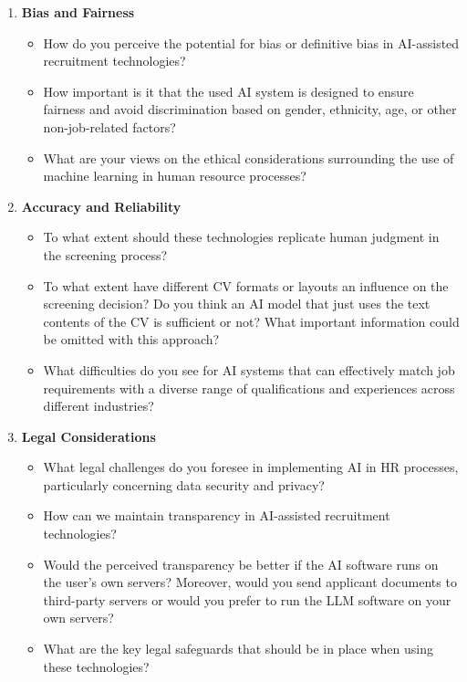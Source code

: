 \documentclass[draft,final]{thesisclass} %
\begin{document}
\begin{enumerate}
    \item \textbf{Bias and Fairness}
    \begin{itemize}
        \item How do you perceive the potential for bias or definitive bias in \acs{AI}-assisted recruitment technologies?
        \item How important is it that the used \acs{AI} system is designed to ensure fairness and avoid discrimination based on gender, ethnicity, age, or other non-job-related factors?
        \item What are your views on the ethical considerations surrounding the use of machine learning in human resource processes?
    \end{itemize}
    \item \textbf{Accuracy and Reliability}
    \begin{itemize}
        \item To what extent should these technologies replicate human judgment in the screening process?
        \item To what extent have different \acs{CV} formats or layouts an influence on the screening decision? Do you think an \acs{AI} model that just uses the text contents of the \acs{CV} is sufficient or not? What important information could be omitted with this approach?
        \item What difficulties do you see for \acs{AI} systems that can effectively match job requirements with a diverse range of qualifications and experiences across different industries?
    \end{itemize}
    \item \textbf{Legal Considerations}
    \begin{itemize}
        \item What legal challenges do you foresee in implementing \acs{AI} in \acs{HR} processes, particularly concerning data security and privacy?
        \item How can we maintain transparency in \acs{AI}-assisted recruitment technologies? 
        \item Would the perceived transparency be better if the \acs{AI} software runs on the user's own servers? Moreover, would you send applicant documents to third-party servers or would you prefer to run the \acs{LLM} software on your own servers?
        \item What are the key legal safeguards that should be in place when using these technologies?

\end{itemize}
\end{enumerate}
\end{document}
